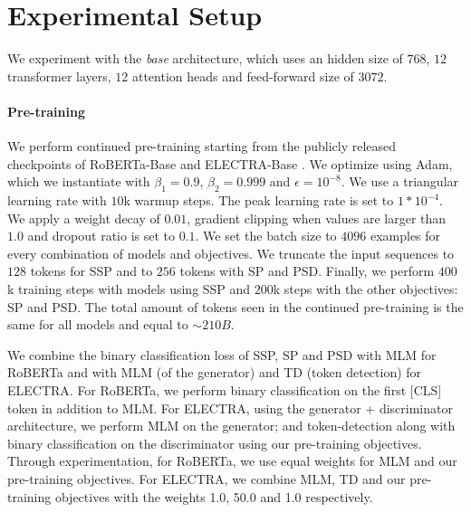 \section{Experimental Setup}
\label{app:experiments}

We experiment with the \textit{base} architecture, which uses an hidden size of $768$, $12$ transformer layers, $12$ attention heads and feed-forward size of $3072$.

\paragraph{Pre-training} We perform continued pre-training starting from the publicly released checkpoints of RoBERTa-Base \cite{liu2019roberta} and ELECTRA-Base \cite{clark2020electra}. We optimize using Adam, which we instantiate with $\beta_1 = 0.9$, $\beta_2 = 0.999$ and $\epsilon = 10^{-8}$. We use a triangular learning rate with $10$k warmup steps. The peak learning rate is set to $1*10^{-4}$. We apply a weight decay of $0.01$, gradient clipping when values are larger than $1.0$ and dropout ratio is set to $0.1$. We set the batch size to $4096$ examples for every combination of models and objectives. We truncate the input sequences to $128$ tokens for SSP and to $256$ tokens with SP and PSD. Finally, we perform $400$k training steps with models using SSP and $200$k steps with the other objectives: SP and PSD. The total amount of tokens seen in the continued pre-training is the same for all models and equal to ${\sim}210B$. 

We combine the binary classification loss of SSP, SP and PSD with MLM for RoBERTa and with MLM (of the generator) and TD (token detection) for ELECTRA. For RoBERTa, we perform binary classification on the first {\small [CLS]} token in addition to MLM. For ELECTRA, using the generator + discriminator architecture, we perform MLM on the generator; and token-detection along with binary classification on the discriminator using our pre-training objectives. Through experimentation, for RoBERTa, we use equal weights for MLM and our pre-training objectives. For ELECTRA, we combine MLM, TD and our pre-training objectives with the weights 1.0, 50.0 and 1.0 respectively.

